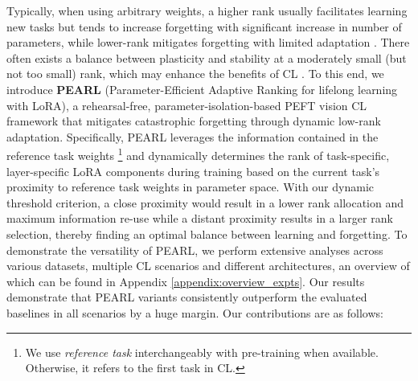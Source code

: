 \documentclass[10pt]{article} %
\begin{document}
Typically, when using arbitrary weights, a higher rank usually facilitates learning new tasks but tends to increase forgetting with significant increase in number of parameters, while lower-rank mitigates forgetting with limited adaptation \citep{lu2024adaptive, biderman2024lora}. There often exists a balance between plasticity and stability at a moderately small (but not too small) rank, which may enhance the benefits of CL \citep{lu2024adaptive}. 
To this end, we introduce \textbf{PEARL} (Parameter-Efficient Adaptive Ranking for lifelong learning with LoRA), a rehearsal-free, parameter-isolation-based PEFT vision CL framework that mitigates catastrophic forgetting through dynamic low-rank adaptation. 
Specifically,  PEARL leverages the information contained in the reference task weights \footnote{We use \textit{reference task} interchangeably with pre-training when available. Otherwise, it refers to the first task in CL.} and dynamically determines the rank of task-specific, layer-specific LoRA components during training based on the current task’s proximity to reference task weights in parameter space. With our dynamic threshold criterion, a close proximity would result in a lower rank allocation and maximum information re-use while a distant proximity results in a larger rank selection, thereby finding an optimal balance between learning and forgetting. To demonstrate the versatility of PEARL, we perform extensive analyses across various datasets, multiple CL scenarios and different architectures, an overview of which can be found in Appendix \ref{appendix:overview_expts}.
Our results demonstrate that PEARL variants consistently outperform the evaluated baselines in all scenarios by a huge margin. Our contributions are as follows:
\end{document}
